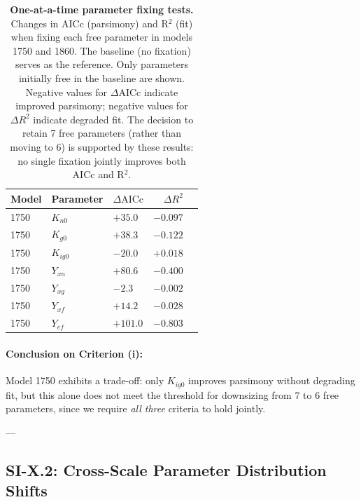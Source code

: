 \begin{table}[H]\centering
\caption{\textbf{One-at-a-time parameter fixing tests.} 
Changes in AICc (parsimony) and R$^2$ (fit) when fixing each free parameter in models 
1750 and 1860. The baseline (no fixation) serves as the reference. Only parameters initially 
free in the baseline are shown. Negative values for $\Delta\mathrm{AICc}$ indicate improved 
parsimony; negative values for $\Delta R^2$ indicate degraded fit. The decision to retain 
7 free parameters (rather than moving to 6) is supported by these results: no single 
fixation jointly improves both AICc and R$^2$.}
\label{tab:SI_X_1_ablation}
\small
\begin{tabular}{lllrr}
\toprule
\textbf{Model} & \textbf{Parameter} & \textbf{$\Delta\mathrm{AICc}$} & \textbf{$\Delta R^2$} \\
\midrule
1750 & $K_{n0}$ & $+35.0$ & $-0.097$ \\
1750 & $K_{g0}$ & $+38.3$ & $-0.122$ \\
1750 & $K_{ig0}$ & $-20.0$ & $+0.018$ \\
1750 & $Y_{xn}$ & $+80.6$ & $-0.400$ \\
1750 & $Y_{xg}$ & $-2.3$ & $-0.002$ \\
1750 & $Y_{xf}$ & $+14.2$ & $-0.028$ \\
1750 & $Y_{ef}$ & $+101.0$ & $-0.803$ \\
\bottomrule
\end{tabular}
\end{table}

\paragraph{Conclusion on Criterion (i):} 
Model 1750 exhibits a trade-off: only $K_{ig0}$ improves parsimony without degrading fit, 
but this alone does not meet the threshold for downsizing from 7 to 6 free parameters, since 
we require \emph{all three} criteria to hold jointly.

---

\subsection{SI-X.2: Cross-Scale Parameter Distribution Shifts}

